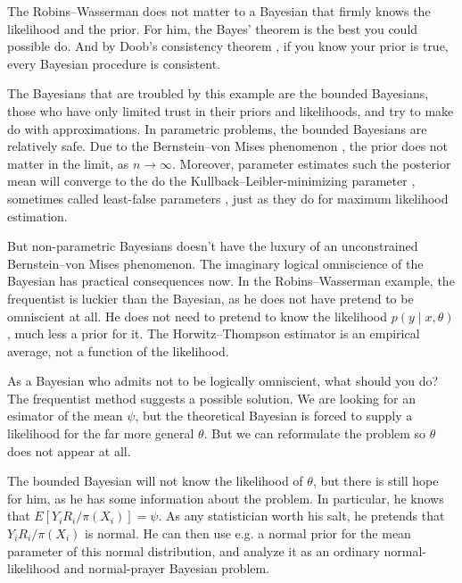 The Robins--Wasserman does not matter to a Bayesian that firmly knows the likelihood and the prior. For him, the Bayes' theorem is the best you could possible do. And by Doob's consistency theorem , if you know your prior is true, every Bayesian procedure is consistent.

The Bayesians that are troubled by this example are the bounded Bayesians, those who have only limited trust in their
priors and likelihoods, and try to make do with approximations. In
parametric problems, the bounded Bayesians are relatively safe. Due
to the Bernstein--von Mises phenomenon \parencite[Section 10.2]{Van_der_Vaart2000-qc},
the prior does not matter in the limit, as $n\to\infty$. Moreover,
parameter estimates such the posterior mean will converge to the do
the Kullback--Leibler-minimizing parameter \parencite[Theorem 2.1]{Bunke1998-vg},
sometimes called least-false parameters \parencite[p. 25]{Claeskens2008-hk},
just as they do for maximum likelihood estimation.

But non-parametric Bayesians doesn't have the luxury of an unconstrained
Bernstein--von Mises phenomenon. The imaginary logical omniscience
of the Bayesian has practical consequences now. In the Robins--Wasserman
example, the frequentist is luckier than the Bayesian, as he does
not have pretend to be omniscient at all. He does not need to pretend
to know the likelihood $p(y\mid x,\theta)$, much less a prior for
it. The Horwitz--Thompson estimator is an empirical average, not
a function of the likelihood.

As a Bayesian who admits not to be logically omniscient, what should
you do? The frequentist method suggests a possible solution. We are
looking for an esimator of the mean $\psi$, but the theoretical Bayesian
is forced to supply a likelihood for the far more general $\theta$.
But we can reformulate the problem so $\theta$ does not appear at
all. 
\begin{example}
 The bounded Bayesian will not know the likelihood of $\theta$,
but there is still hope for him, as he has some information about
the problem. In particular, he knows that $E[Y_{i}R_{i}/\pi(X_{i})]=\psi$.
As any statistician worth his salt, he pretends that $Y_{i}R_{i}/\pi(X_{i})$
is normal. He can then use e.g. a normal prior for the mean parameter
of this normal distribution, and analyze it as an ordinary normal-likelihood
and normal-prayer Bayesian problem.
\end{example}

